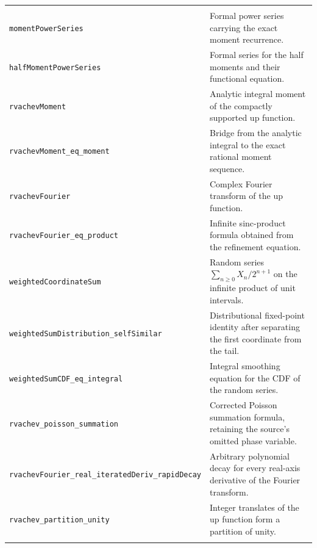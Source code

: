 \documentclass[11pt,a4paper,openany]{book}
\newcommand{\pathbreak}[1]{\nolinkurl{#1}}
\begin{document}
\begin{longtable}{@{}>{\raggedright\arraybackslash}p{}p{}@{}}
\multicolumn{2}{@{}l}{\sffamily\bfseries\color{OliveDark} Moments, transforms, and probability} \\
\addlinespace[.45em]
\pathbreak{momentPowerSeries} & Formal power series carrying the exact moment recurrence. \\
\addlinespace[.28em]
\pathbreak{halfMomentPowerSeries} & Formal series for the half moments and their functional equation. \\
\addlinespace[.28em]
\pathbreak{rvachevMoment} & Analytic integral moment of the compactly supported up function. \\
\addlinespace[.28em]
\pathbreak{rvachevMoment_eq_moment} & Bridge from the analytic integral to the exact rational moment sequence. \\
\addlinespace[.28em]
\pathbreak{rvachevFourier} & Complex Fourier transform of the up function. \\
\addlinespace[.28em]
\pathbreak{rvachevFourier_eq_product} & Infinite sinc-product formula obtained from the refinement equation. \\
\addlinespace[.28em]
\pathbreak{weightedCoordinateSum} & Random series $\sum_{n\ge0}X_n/2^{n+1}$ on the infinite product of unit intervals. \\
\addlinespace[.28em]
\pathbreak{weightedSumDistribution_selfSimilar} & Distributional fixed-point identity after separating the first coordinate from the tail. \\
\addlinespace[.28em]
\pathbreak{weightedSumCDF_eq_integral} & Integral smoothing equation for the CDF of the random series. \\
\addlinespace[.28em]
\pathbreak{rvachev_poisson_summation} & Corrected Poisson summation formula, retaining the source's omitted phase variable. \\
\addlinespace[.28em]
\pathbreak{rvachevFourier_real_iteratedDeriv_rapidDecay} & Arbitrary polynomial decay for every real-axis derivative of the Fourier transform. \\
\addlinespace[.28em]
\pathbreak{rvachev_partition_unity} & Integer translates of the up function form a partition of unity. \\
\addlinespace[.28em]


\end{longtable}
\end{document}
